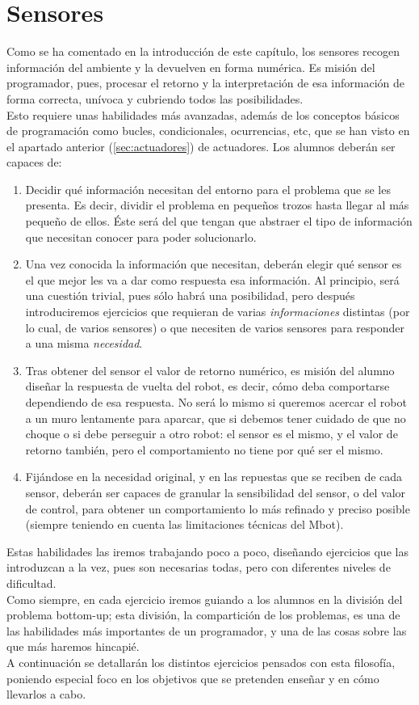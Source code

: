 \section{Sensores}
Como se ha comentado en la introducción de este capítulo, los sensores recogen información del ambiente y la devuelven en forma numérica. Es misión del programador, pues, procesar el retorno y la interpretación de esa información de forma correcta, unívoca y cubriendo todos las posibilidades. \\
Esto requiere unas habilidades más avanzadas, además de los conceptos básicos de programación como bucles, condicionales, ocurrencias, etc, que se han visto en el apartado anterior (\ref{sec:actuadores}) de actuadores. Los alumnos deberán ser capaces de: \\
\begin{enumerate}
	\item Decidir qué información necesitan del entorno para el problema que se les presenta. Es decir, dividir el problema en pequeños trozos hasta llegar al más pequeño de ellos. Éste será del que tengan que abstraer el tipo de información que necesitan conocer para poder solucionarlo.
	\item Una vez conocida la información que necesitan, deberán elegir qué sensor es el que mejor les va a dar como respuesta esa información. Al principio, será una cuestión trivial, pues sólo habrá una posibilidad, pero después introduciremos ejercicios que requieran de varias \textit{informaciones} distintas (por lo cual, de varios sensores) o que necesiten de varios sensores para responder a una misma \textit{necesidad}.
	\item Tras obtener del sensor el valor de retorno numérico, es misión del alumno diseñar la respuesta de vuelta del robot, es decir, cómo deba comportarse dependiendo de esa respuesta. No será lo mismo si queremos acercar el robot a un muro lentamente para aparcar, que si debemos tener cuidado de que no choque o si debe perseguir a otro robot: el sensor es el mismo, y el valor de retorno también, pero el comportamiento no tiene por qué ser el mismo. 	
	\item Fijándose en la necesidad original, y en las repuestas que se reciben de cada sensor, deberán ser capaces de granular la sensibilidad del sensor, o del valor de control, para obtener un comportamiento lo más refinado y preciso posible (siempre teniendo en cuenta las limitaciones técnicas del Mbot).
\end{enumerate}
Estas habilidades las iremos trabajando poco a poco, diseñando ejercicios que las introduzcan a la vez, pues son necesarias todas, pero con diferentes niveles de dificultad.\\
Como siempre, en cada ejercicio iremos guiando a los alumnos en la división del problema bottom-up; esta división, la compartición de los problemas, es una de las habilidades más importantes de un programador, y una de las cosas sobre las que más haremos hincapié.\\
A continuación se detallarán los distintos ejercicios pensados con esta filosofía, poniendo especial foco en los objetivos que se pretenden enseñar y en cómo llevarlos a cabo.

